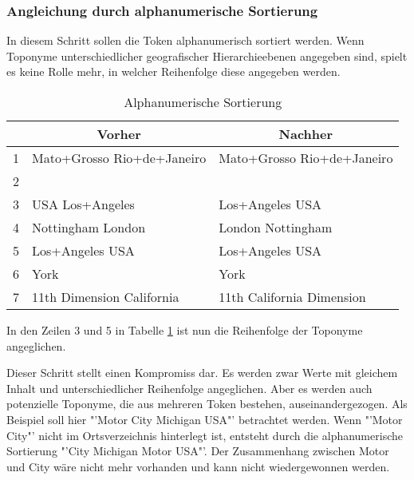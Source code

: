 			\subsubsection{Angleichung durch alphanumerische Sortierung}

				In diesem Schritt sollen die Token alphanumerisch sortiert werden. 
				Wenn Toponyme unterschiedlicher geografischer Hierarchieebenen angegeben sind, spielt es keine Rolle mehr, in welcher Reihenfolge diese angegeben werden.

				\begin{table}[h]
				\centering
				\caption{Alphanumerische Sortierung}
				\label{tab:VorverarbeitungAlpha}
				\begin{tabular}{|l|l|l|}
				\hline
				  & \multicolumn{1}{c|}{\textbf{Vorher}} & \multicolumn{1}{c|}{\textbf{Nachher}} \\ \hline
				1 & Mato+Grosso Rio+de+Janeiro           & Mato+Grosso Rio+de+Janeiro            \\ \hline
				2 &                                      &                                       \\ \hline
				3 & USA Los+Angeles                      & Los+Angeles USA                       \\ \hline
				4 & Nottingham London                    & London Nottingham                     \\ \hline
				5 & Los+Angeles USA                      & Los+Angeles USA                       \\ \hline
				6 & York                                 & York                                  \\ \hline
				7 & 11th Dimension California            & 11th California Dimension             \\ \hline
				\end{tabular}
				\end{table}

				In den Zeilen 3 und 5 in Tabelle \ref{tab:VorverarbeitungAlpha} ist nun die Reihenfolge der Toponyme angeglichen. 
				
				Dieser Schritt stellt einen Kompromiss dar.
				Es werden zwar Werte mit gleichem Inhalt und unterschiedlicher Reihenfolge angeglichen.
				Aber es werden auch potenzielle Toponyme, die aus mehreren Token bestehen, auseinandergezogen.
				Als Beispiel soll hier "'Motor City Michigan USA"' betrachtet werden.
				Wenn "'Motor City"' nicht im Ortsverzeichnis hinterlegt ist, entsteht durch die alphanumerische Sortierung "'City Michigan Motor USA"'.
				Der Zusammenhang zwischen Motor und City wäre nicht mehr vorhanden und kann nicht wiedergewonnen werden.


